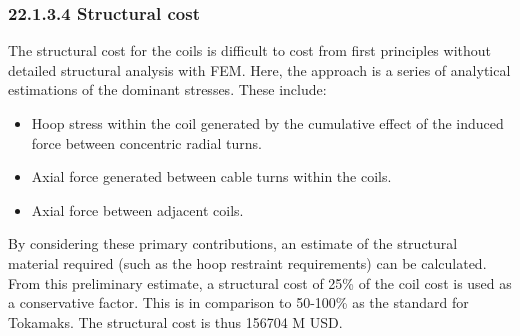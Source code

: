 \subsubsection*{22.1.3.4 Structural cost}

The structural cost for the coils is difficult to cost from first principles without detailed structural analysis with FEM. Here, the approach is a series of analytical estimations of the dominant stresses. These include:

\begin{itemize}
    \item Hoop stress within the coil generated by the cumulative effect of the induced force between concentric radial turns.
    \item Axial force generated between cable turns within the coils. 
    \item Axial force between adjacent coils.
\end{itemize}


By considering these primary contributions, an estimate of the structural material required (such as the hoop restraint requirements) can be calculated. From this preliminary estimate, a structural cost of 25\% of the coil cost is used as a conservative factor. This is in comparison to 50-100\% as the standard for Tokamaks. The structural cost is thus 156704 M USD.


